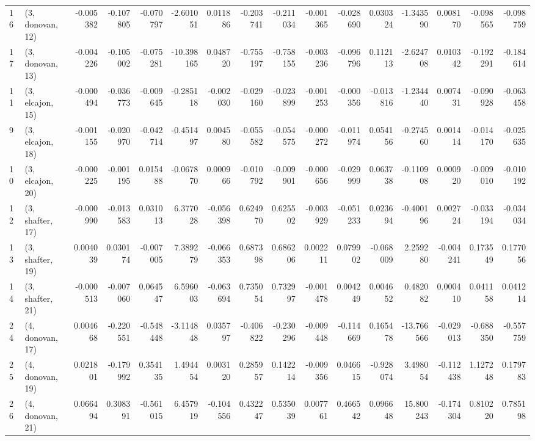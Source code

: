 \begin{tabular}{llrrrrrrrrrrrrrr}
16 &  (3, donovan, 12) &  -0.005382 & -0.107805 & -0.070797 &  -2.601051 &  0.011886 &  -0.203741 & -0.211034 & -0.001365 & -0.028690 &  0.030324 &  -1.343590 &  0.008170 & -0.098565 & -0.098759 \\
17 &  (3, donovan, 13) &  -0.004226 & -0.105002 & -0.075281 & -10.398165 &  0.048720 &  -0.755197 & -0.758155 & -0.003236 & -0.096796 &  0.112113 &  -2.624708 &  0.010342 & -0.192291 & -0.184614 \\
11 &  (3, elcajon, 15) &  -0.000494 & -0.036773 & -0.009645 &  -0.285118 & -0.002030 &  -0.029160 & -0.023899 & -0.001253 & -0.000356 & -0.013816 &  -1.234440 &  0.007431 & -0.090928 & -0.063458 \\
9  &  (3, elcajon, 18) &  -0.001155 & -0.020970 & -0.042714 &  -0.451497 &  0.004580 &  -0.055582 & -0.054575 & -0.000272 & -0.011974 &  0.054156 &  -0.274560 &  0.001414 & -0.014170 & -0.025635 \\
10 &  (3, elcajon, 20) &  -0.000225 & -0.001195 &  0.015488 &  -0.067870 &  0.000966 &  -0.010792 & -0.009901 & -0.000656 & -0.029999 &  0.063738 &  -0.110908 &  0.000920 & -0.009010 & -0.010192 \\
12 &  (3, shafter, 17) &  -0.000990 & -0.013583 &  0.031013 &   6.377028 & -0.056398 &   0.624970 &  0.625502 & -0.003929 & -0.051233 &  0.023694 &  -0.400196 &  0.002724 & -0.033194 & -0.034034 \\
13 &  (3, shafter, 19) &   0.004039 &  0.030174 & -0.007005 &   7.389279 & -0.066353 &   0.687398 &  0.686206 &  0.002211 &  0.079902 & -0.068009 &   2.259280 & -0.004241 &  0.173549 &  0.177056 \\
14 &  (3, shafter, 21) &  -0.000513 & -0.007060 &  0.064547 &   6.596003 & -0.063694 &   0.735054 &  0.732997 & -0.001478 &  0.004249 &  0.004652 &   0.482082 &  0.000410 &  0.041158 &  0.041214 \\
24 &  (4, donovan, 17) &   0.004668 & -0.220551 & -0.548448 &  -3.114848 &  0.035797 &  -0.406822 & -0.230296 & -0.009448 & -0.114669 &  0.165478 & -13.766566 & -0.029013 & -0.688350 & -0.557759 \\
25 &  (4, donovan, 19) &   0.021801 & -0.179992 &  0.354135 &   1.494454 &  0.003120 &   0.285957 &  0.142214 & -0.009356 &  0.046615 & -0.928074 &   3.498054 & -0.112438 &  1.127248 &  0.179783 \\
26 &  (4, donovan, 21) &   0.066494 &  0.308391 & -0.561015 &   6.457919 & -0.104556 &   0.432247 &  0.535039 &  0.007761 &  0.466542 &  0.096648 &  15.800243 & -0.174304 &  0.810220 &  0.785198 \\

\end{tabular}
